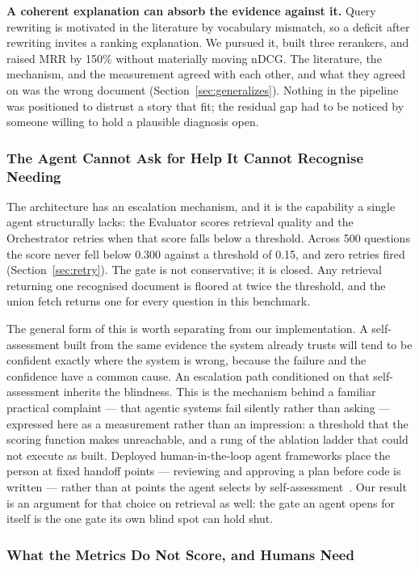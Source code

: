 \documentclass[acmsmall,review,anonymous,screen]{acmart}
\begin{document}
\textbf{A coherent explanation can absorb the evidence against it.} Query
rewriting is motivated in the literature by vocabulary mismatch, so a deficit
after rewriting invites a ranking explanation. We pursued it, built three
rerankers, and raised MRR by 150\% without materially moving nDCG. The
literature, the mechanism, and the measurement agreed with each other, and what
they agreed on was the wrong document (Section~\ref{sec:generalizes}). Nothing
in the pipeline was positioned to distrust a story that fit; the residual gap
had to be noticed by someone willing to hold a plausible diagnosis open.

\subsubsection{The Agent Cannot Ask for Help It Cannot Recognise Needing}

The architecture has an escalation mechanism, and it is the capability a single
agent structurally lacks: the Evaluator scores retrieval quality and the
Orchestrator retries when that score falls below a threshold. Across 500
questions the score never fell below 0.300 against a threshold of 0.15, and
zero retries fired (Section~\ref{sec:retry}). The gate is not conservative; it
is closed. Any retrieval returning one recognised document is floored at twice
the threshold, and the union fetch returns one for every question in this
benchmark.

The general form of this is worth separating from our implementation. A
self-assessment built from the same evidence the system already trusts will
tend to be confident exactly where the system is wrong, because the failure and
the confidence have a common cause. An escalation path conditioned on that
self-assessment inherits the blindness. This is the mechanism behind a familiar
practical complaint --- that agentic systems fail silently rather than asking
--- expressed here as a measurement rather than an impression: a threshold that
the scoring function makes unreachable, and a rung of the ablation ladder that
could not execute as built. Deployed human-in-the-loop agent frameworks
place the person at fixed handoff points --- reviewing and approving a plan
before code is written --- rather than at points the agent selects by
self-assessment~\cite{takerngsaksiri2025hula}. Our result is an argument for
that choice on retrieval as well: the gate an agent opens for itself is the one
gate its own blind spot can hold shut.

\subsubsection{What the Metrics Do Not Score, and Humans Need}
\end{document}
